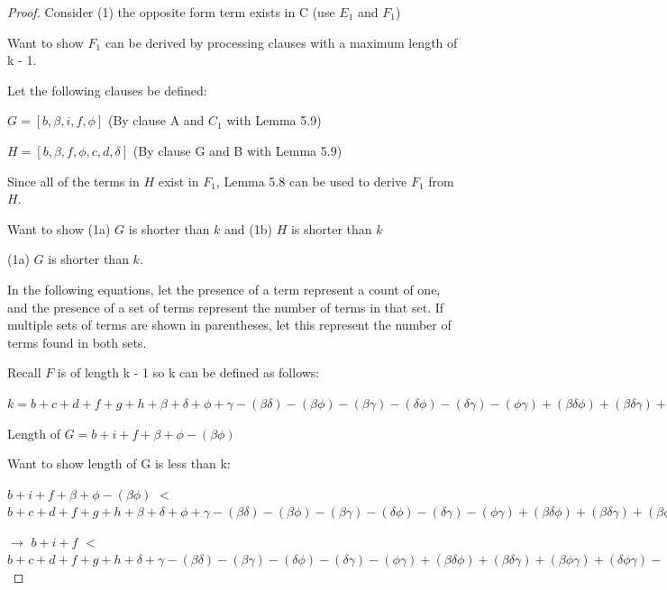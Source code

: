 \documentclass[manuscript]{acmart}
\begin{document}
\begin{proof}
        Consider (1) the opposite form term exists in C (use $E_1$ and $F_1$)

        Want to show $F_1$ can be derived by processing clauses with a maximum
        length of k - 1.

        Let the following clauses be defined:

        $G = [b, \beta, i, f, \phi]$ (By clause A and $C_1$ with Lemma 5.9)

        $H = [b, \beta, f, \phi, c, d, \delta]$ (By clause G and B with Lemma 5.9)

        Since all of the terms in $H$ exist in $F_1$, Lemma 5.8 can be used to
        derive $F_1$ from $H$.

        Want to show (1a) $G$ is shorter than $k$ and (1b) $H$ is shorter than $k$

        (1a) $G$ is shorter than $k$.

        In the following equations, let the presence of a term represent a count of one,
        and the presence of a set of terms represent the number of terms in that set. If
        multiple sets of terms are shown in parentheses, let this represent the number
        of terms found in both sets.
        
        Recall $F$ is of length k - 1 so k can be defined as follows:
        
        $k = b + c + d + f + g + h 
        + \beta + \delta + \phi + \gamma
        - (\beta \delta) - (\beta \phi) - (\beta \gamma) - (\delta \phi) - (\delta \gamma) - (\phi \gamma)
        + (\beta \delta \phi) + (\beta \delta \gamma) + (\beta \phi \gamma) + (\delta \phi \gamma)
        - (\beta \delta \phi \gamma)
        + 1
        $

        Length of $G = b + i + f + \beta + \phi - (\beta \phi)$

        Want to show length of G is less than k:

        $b + i + f + \beta + \phi - (\beta \phi)$
        $<$
        $b + c + d + f + g + h 
        + \beta + \delta + \phi + \gamma
        - (\beta \delta) - (\beta \phi) - (\beta \gamma) - (\delta \phi) - (\delta \gamma) - (\phi \gamma)
        + (\beta \delta \phi) + (\beta \delta \gamma) + (\beta \phi \gamma) + (\delta \phi \gamma)
        - (\beta \delta \phi \gamma) 
        + 1
        $

        $\rightarrow$ $b + i + f$
        $<$
        $b + c + d + f + g + h 
         + \delta + \gamma
        - (\beta \delta) - (\beta \gamma) - (\delta \phi) - (\delta \gamma) - (\phi \gamma)
        + (\beta \delta \phi) + (\beta \delta \gamma) + (\beta \phi \gamma) + (\delta \phi \gamma)
        - (\beta \delta \phi \gamma) 
        + 1
        $


\end{proof}
\end{document}

